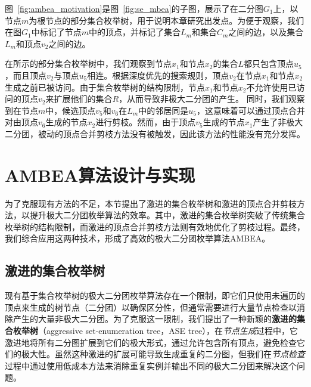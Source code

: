 \begin{example}
  图~\ref{fig:ambea_motivation}是图~\ref{fig:se_mbea}的子图，展示了在二分图$G_1$上，以节点$m$为根节点的部分集合枚举树，用于说明本章研究出发点。为便于观察，我们在图$G_1$中标记了节点$m$中的顶点，并标记了集合$L_m$和集合$C_m$之间的边，以及集合$L_m$和顶点$v_2$之间的边。

  在所示的部分集合枚举树中，我们观察到节点$x_1$和节点$x_2$的集合$L$都只包含顶点$u_5$，而且顶点$v_2$与顶点$u_5$相连。根据深度优先的搜索规则，顶点$v_2$在节点$x_1$和节点$x_2$生成之前已被访问。由于集合枚举树的结构限制，节点$x_1$和节点$x_2$不允许使用已访问的顶点$v_2$来扩展他们的集合$R$，从而导致非极大二分团的产生。
  同时，我们观察到在节点$m$中，候选顶点$v_5$和$v_6$在$L_m$中的邻居同是$u_5$，这意味着可以通过顶点合并对由顶点$v_6$生成的节点$x_2$进行剪枝。然而，由于顶点$v_5$生成的节点$x_1$产生了非极大二分团，被动的顶点合并剪枝方法没有被触发，因此该方法的性能没有充分发挥。

\end{example}

\section{AMBEA算法设计与实现}

为了克服现有方法的不足，本节提出了激进的集合枚举树和激进的顶点合并剪枝方法，以提升极大二分团枚举算法的效率。其中，激进的集合枚举树突破了传统集合枚举树的结构限制，而激进的顶点合并剪枝方法则有效地优化了剪枝过程。最终，我们综合应用这两种技术，形成了高效的极大二分团枚举算法AMBEA。

\subsection{激进的集合枚举树}
\label{subsec:ase}

现有基于集合枚举树的极大二分团枚举算法存在一个限制，即它们只使用未遍历的顶点来生成的树节点（二分团）以确保区分性，但通常需要进行大量节点检查以消除产生的大量非极大二分团。为了克服这一限制，我们提出了一种新颖的\textbf{激进的集合枚举树}（aggressive set-enumeration tree，ASE tree），在\textit{节点生成}过程中，它激进地将所有二分图扩展到它们的极大形式，通过允许包含所有顶点，避免检查它们的极大性。虽然这种激进的扩展可能导致生成重复的二分图，但我们在\textit{节点检查}过程中通过使用低成本方法来消除重复实例并输出不同的极大二分团来解决这个问题。


